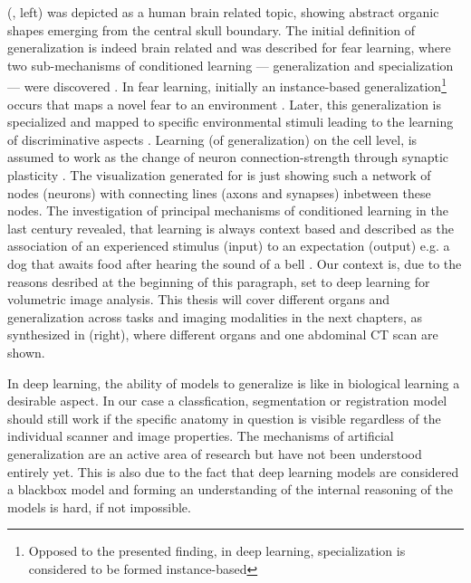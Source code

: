      (, left) was depicted as a human brain related topic, showing abstract organic shapes emerging from the central skull boundary.
    The initial definition of generalization is indeed brain related and was described for fear learning, where two sub-mechanisms of conditioned learning --- generalization and specialization --- were discovered \citep{xx, banich2011generalization}. %
    In fear learning, initially an instance-based generalization\footnote{Opposed to the presented finding, in deep learning, specialization is considered to be formed instance-based} occurs that maps a novel fear to an environment \citep{banich2011generalization}.
    Later, this generalization is specialized and mapped to specific environmental stimuli leading to the learning of discriminative aspects \citep{banich2011generalization}.
    Learning (of generalization) on the cell level, is assumed to work as the change of neuron connection-strength through synaptic plasticity \citep{do1949organization,martin2000synaptic}. The visualization generated for  is just showing such a network of nodes (neurons) with connecting lines (axons and synapses) inbetween these nodes.
    The investigation of principal mechanisms of conditioned learning in the last century revealed, that learning is always context based and described as the association of an experienced stimulus (input) to an expectation (output) e.g. a dog that awaits food after hearing the sound of a bell \citep{pavlov1928conditioned, pavlov2010conditioned, banich2011generalization}.
    Our context is, due to the reasons desribed at the beginning of this paragraph, set to deep learning for volumetric image analysis. This thesis will cover different organs and generalization across tasks and imaging modalities in the next chapters, as synthesized in  (right), where different organs and one abdominal \ac{CT} scan are shown. %

    In deep learning, the ability of models to generalize is like in biological learning a desirable aspect. In our case a classfication, segmentation or registration model should still work if the specific anatomy in question is visible regardless of the individual scanner and image properties.
    The mechanisms of artificial generalization are an active area of research but have not been understood entirely yet. This is also due to the fact that deep learning models are considered a blackbox model and forming an understanding of the internal reasoning of the models is hard, if not impossible.

